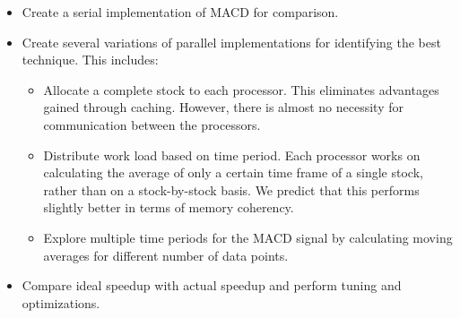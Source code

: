 \documentclass[11pt,english]{article} %
\begin{document}
\begin{itemize}

	\item Create a serial implementation of MACD for comparison.

	\item Create several variations of parallel implementations for identifying the best technique. This includes:
	\begin{itemize}
		\item Allocate a complete stock to each processor. This eliminates advantages gained through caching. However, there is almost no necessity for communication between the processors.
		\item Distribute work load based on time period. Each processor works on calculating the average of only a certain time frame of a single stock, rather than on a stock-by-stock basis. We predict that this performs slightly better in terms of memory coherency. 
		\item Explore multiple time periods for the MACD signal by calculating moving averages for different number of data points.
	\end{itemize}

	\item Compare ideal speedup with actual speedup and perform tuning and optimizations.

\end{itemize}
\end{document}
